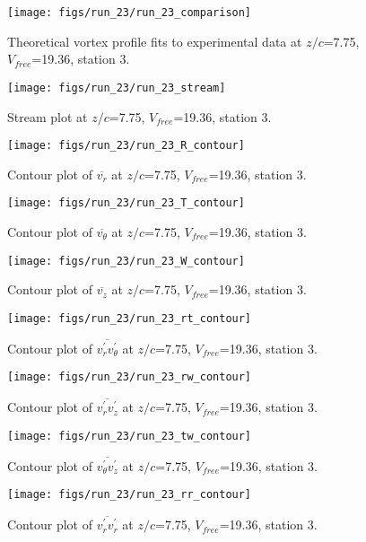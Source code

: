\begin{figure}[H]
\centering
\texttt{[image: figs/run\_23/run\_23\_comparison]}
\caption{Theoretical vortex profile fits to experimental data at $z/c$=7.75, $V_{free}$=19.36, station 3.}
\end{figure}


\begin{figure}[H]
\centering
\texttt{[image: figs/run\_23/run\_23\_stream]}
\caption{Stream plot at $z/c$=7.75, $V_{free}$=19.36, station 3.}
\end{figure}


\begin{figure}[H]
\centering
\texttt{[image: figs/run\_23/run\_23\_R\_contour]}
\caption{Contour plot of $\overline{v_{r}}$ at $z/c$=7.75, $V_{free}$=19.36, station 3.}
\end{figure}


\begin{figure}[H]
\centering
\texttt{[image: figs/run\_23/run\_23\_T\_contour]}
\caption{Contour plot of $\overline{v_{\theta}}$ at $z/c$=7.75, $V_{free}$=19.36, station 3.}
\end{figure}


\begin{figure}[H]
\centering
\texttt{[image: figs/run\_23/run\_23\_W\_contour]}
\caption{Contour plot of $\overline{v_{z}}$ at $z/c$=7.75, $V_{free}$=19.36, station 3.}
\end{figure}


\begin{figure}[H]
\centering
\texttt{[image: figs/run\_23/run\_23\_rt\_contour]}
\caption{Contour plot of $\overline{v_{r}^{\prime} v_{\theta}^{\prime}}$ at $z/c$=7.75, $V_{free}$=19.36, station 3.}
\end{figure}


\begin{figure}[H]
\centering
\texttt{[image: figs/run\_23/run\_23\_rw\_contour]}
\caption{Contour plot of $\overline{v_{r}^{\prime} v_{z}^{\prime}}$ at $z/c$=7.75, $V_{free}$=19.36, station 3.}
\end{figure}


\begin{figure}[H]
\centering
\texttt{[image: figs/run\_23/run\_23\_tw\_contour]}
\caption{Contour plot of $\overline{v_{\theta}^{\prime} v_{z}^{\prime}}$ at $z/c$=7.75, $V_{free}$=19.36, station 3.}
\end{figure}


\begin{figure}[H]
\centering
\texttt{[image: figs/run\_23/run\_23\_rr\_contour]}
\caption{Contour plot of $\overline{v_{r}^{\prime} v_{r}^{\prime}}$ at $z/c$=7.75, $V_{free}$=19.36, station 3.}
\end{figure}


